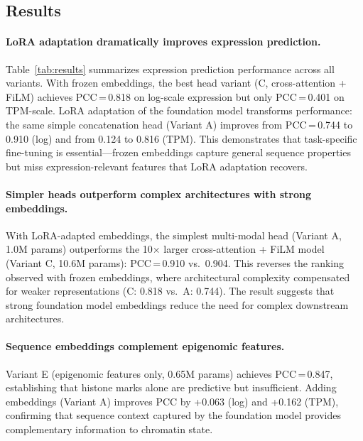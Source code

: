 \begin{methods}
\section{Results}\label{sec:results}

\paragraph{LoRA adaptation dramatically improves expression prediction.}
Table~\ref{tab:results} summarizes expression prediction performance across all variants. With frozen \botanic embeddings, the best head variant (C, cross-attention + FiLM) achieves PCC\,=\,0.818 on log-scale expression but only PCC\,=\,0.401 on TPM-scale. LoRA adaptation of the foundation model transforms performance: the same simple concatenation head (Variant A) improves from PCC\,=\,0.744 to 0.910 (log) and from 0.124 to 0.816 (TPM). This demonstrates that task-specific fine-tuning is essential---frozen embeddings capture general sequence properties but miss expression-relevant features that LoRA adaptation recovers.

\paragraph{Simpler heads outperform complex architectures with strong embeddings.}
With LoRA-adapted embeddings, the simplest multi-modal head (Variant A, 1.0M params) outperforms the 10$\times$ larger cross-attention + FiLM model (Variant C, 10.6M params): PCC\,=\,0.910 vs.\ 0.904. This reverses the ranking observed with frozen embeddings, where architectural complexity compensated for weaker representations (C: 0.818 vs.\ A: 0.744). The result suggests that strong foundation model embeddings reduce the need for complex downstream architectures.

\paragraph{Sequence embeddings complement epigenomic features.}
Variant E (epigenomic features only, 0.65M params) achieves PCC\,=\,0.847, establishing that histone marks alone are predictive but insufficient. Adding \botanic embeddings (Variant A) improves PCC by +0.063 (log) and +0.162 (TPM), confirming that sequence context captured by the foundation model provides complementary information to chromatin state.


\end{methods}
